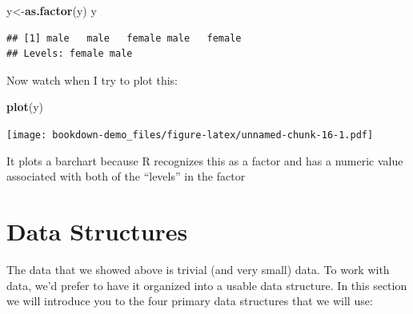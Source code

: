 \documentclass[]{book}
\newenvironment{Shaded}{\begin{snugshade}}{\end{snugshade}}
\newcommand{\KeywordTok}[1]{\textcolor[rgb]{0.13,0.29,0.53}{\textbf{{#1}}}}
\newcommand{\NormalTok}[1]{{#1}}
\begin{document}
\begin{Shaded}
\begin{Highlighting}[]
\NormalTok{y<-}\KeywordTok{as.factor}\NormalTok{(y)}
\NormalTok{y}
\end{Highlighting}
\end{Shaded}

\begin{verbatim}
## [1] male   male   female male   female
## Levels: female male
\end{verbatim}

Now watch when I try to plot this:

\begin{Shaded}
\begin{Highlighting}[]
\KeywordTok{plot}\NormalTok{(y)}
\end{Highlighting}
\end{Shaded}

\texttt{[image: bookdown-demo\_files/figure-latex/unnamed-chunk-16-1.pdf]}

It plots a barchart because R recognizes this as a factor and has a
numeric value associated with both of the ``levels'' in the factor

\section{Data Structures}\label{data-structures}

The data that we showed above is trivial (and very small) data. To work
with data, we'd prefer to have it organized into a usable data
structure. In this section we will introduce you to the four primary
data structures that we will use:
\end{document}
